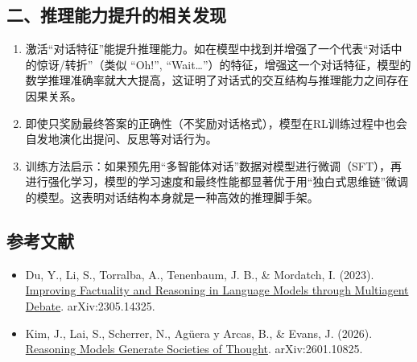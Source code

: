 \hypertarget{ux4e8cux63a8ux7406ux80fdux529bux63d0ux5347ux7684ux76f8ux5173ux53d1ux73b0}{%
\subsection{二、推理能力提升的相关发现}\label{ux4e8cux63a8ux7406ux80fdux529bux63d0ux5347ux7684ux76f8ux5173ux53d1ux73b0}}

\begin{enumerate}
\def\labelenumi{\arabic{enumi}.}
\item
  激活``对话特征''能提升推理能力。如在模型中找到并增强了一个代表``对话中的惊讶/转折''（类似 ``Oh!'', ``Wait\ldots{}''）的特征，增强这一个对话特征，模型的数学推理准确率就大大提高，这证明了对话式的交互结构与推理能力之间存在因果关系。
\item
  即使只奖励最终答案的正确性（不奖励对话格式），模型在RL训练过程中也会自发地演化出提问、反思等对话行为。
\item
  训练方法启示：如果预先用``多智能体对话''数据对模型进行微调（SFT），再进行强化学习，模型的学习速度和最终性能都显著优于用``独白式思维链''微调的模型。这表明对话结构本身就是一种高效的推理脚手架。
\end{enumerate}

\hypertarget{ux53c2ux8003ux6587ux732e-127}{%
\subsection{参考文献}\label{ux53c2ux8003ux6587ux732e-127}}

\begin{itemize}
\tightlist
\item
  Du, Y., Li, S., Torralba, A., Tenenbaum, J. B., \& Mordatch, I. (2023). \href{https://arxiv.org/abs/2305.14325}{Improving Factuality and Reasoning in Language Models through Multiagent Debate}. arXiv:2305.14325.
\item
  Kim, J., Lai, S., Scherrer, N., Agüera y Arcas, B., \& Evans, J. (2026). \href{https://arxiv.org/abs/2601.10825}{Reasoning Models Generate Societies of Thought}. arXiv:2601.10825.
\end{itemize}

\clearpage
